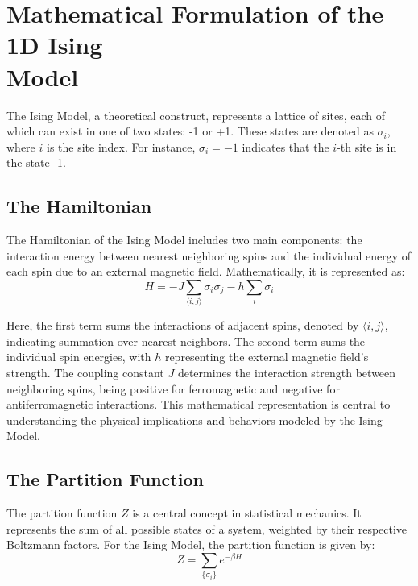 \section[Mathematical Formulation of the 1D Ising
Model]{\texorpdfstring{Mathematical Formulation of the 1D
Ising\\Model}{Mathematical Formulation of the 1D Ising Model}}
\label{sec:ising1d}

The Ising Model, a theoretical construct, represents a lattice of sites, each of
which can exist in one of two states: -1 or +1. These states are denoted as
$\sigma_i$, where $i$ is the site index. For instance, $\sigma_i = -1$ indicates
that the $i$-th site is in the state -1.

\subsection{The Hamiltonian}
The Hamiltonian of the Ising Model includes two main components: the interaction
energy between nearest neighboring spins and the individual energy of each spin
due to an external magnetic field. Mathematically, it is represented as:
\begin{equation}
  \label{eq:hamiltonian}
  H = -J \sum_{\langle i,j \rangle} \sigma_i \sigma_j - h \sum_{i} \sigma_i
\end{equation}

Here, the first term sums the interactions of adjacent spins, denoted by
$\langle i,j \rangle$, indicating summation over nearest neighbors. The second
term sums the individual spin energies, with $h$ representing the external
magnetic field's strength. The coupling constant $J$ determines the interaction
strength between neighboring spins, being positive for ferromagnetic and
negative for antiferromagnetic interactions. This mathematical representation is
central to understanding the physical implications and behaviors modeled by the
Ising Model.

\subsection{The Partition Function}
The partition function $Z$ is a central concept in statistical mechanics. It
represents the sum of all possible states of a system, weighted by their
respective Boltzmann factors. For the Ising Model, the partition function is
given by:
\begin{equation}
  \label{eq:partition}
  Z = \sum_{\{\sigma_i\}} e^{-\beta H}
\end{equation}

